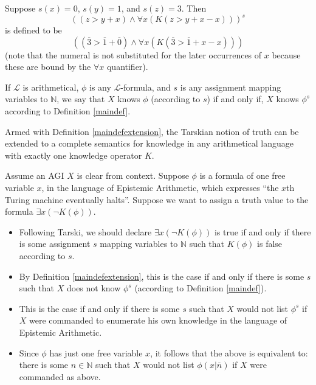 \documentclass[runningheads]{llncs}
\begin{document}
\begin{example}
  Suppose $s(x)=0$, $s(y)=1$, and $s(z)=3$. Then
  \[
  ((z>y+x) \wedge \forall x(K(z>y+x-x)))^s
  \]
  is defined to be
  \[
  ((\overline 3 > \overline 1+\overline 0)
  \wedge \forall x( K( \overline 3 > \overline 1 + x - x ) ))
  \]
  (note that the numeral is not substituted for the later occurrences of $x$ because
  these are bound by the $\forall x$ quantifier).
\end{example}

\begin{definition}
\label{maindefextension}
  If $\mathscr L$ is arithmetical, $\phi$ is any $\mathscr L$-formula,
  and $s$ is any assignment mapping variables to $\mathbb N$,
  we say that $X$ knows $\phi$ (according to $s$) if and only if,
  $X$ knows $\phi^s$ according to Definition \ref{maindef}.
\end{definition}

Armed with Definition \ref{maindefextension}, the Tarskian notion
\cite{sep-tarski-truth} of
truth can be extended to a complete semantics for
knowledge in any arithmetical language with exactly one knowledge operator $K$.

\begin{example}
  Assume an AGI $X$ is clear from context.
  Suppose $\phi$ is a formula of one free variable $x$, in the language of Epistemic Arithmetic,
  which expresses ``the $x$th Turing machine eventually halts''. Suppose we want to
  assign a truth value to the formula $\exists x (\neg K(\phi))$.
  \begin{itemize}
  \item Following Tarski, we should declare $\exists x (\neg K(\phi))$
  is true if and only if there is some assignment $s$ mapping variables to $\mathbb N$
  such that $K(\phi)$ is false according to $s$.
  \item By Definition \ref{maindefextension}, this is the case if and only if
  there is some $s$ such that
  $X$ does not know $\phi^s$ (according to Definition \ref{maindef}).
  \item
  This is the case if and only if there is some $s$ such that $X$ would not
  list $\phi^s$ if $X$ were commanded
  to enumerate his own knowledge in the language of Epistemic Arithmetic.
  \item
  Since $\phi$ has just one free variable $x$, it follows that the above is equivalent to:
  there is some $n\in\mathbb N$ such that $X$ would not list $\phi(x|\overline n)$
  if $X$ were commanded as above.
  \end{itemize}
\end{example}
\end{document}
